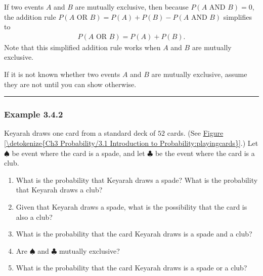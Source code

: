 \documentclass[letterpaper,10pt,english]{jupyterBook}
\begin{document}
\sphinxAtStartPar
If two events \(A\) and \(B\) are mutually exclusive, then because \(P(A \text{ AND } B) = 0\), the addition rule \(P(A \text{ OR } B) = P(A) + P(B) - P(A \text{ AND } B)\) simplifies to
\begin{equation*}
\begin{split} P(A\text{ OR } B) = P(A) + P(B). \end{split}
\end{equation*}
\sphinxAtStartPar
Note that this simplified addition rule works  when \(A\) and \(B\) are mutually exclusive.

\sphinxAtStartPar
If it is not known whether two events \(A\) and \(B\) are mutually exclusive, assume they are not until you can show otherwise.


\bigskip\hrule\bigskip



\subsubsection{Example 3.4.2}
\label{\detokenize{Ch3 Probability/3.4 Addition Rules and Mutually Exclusive Events:example-3-4-2}}
\sphinxAtStartPar
Keyarah draws one card from a standard deck of \(52\) cards. (See \hyperref[\detokenize{Ch3 Probability/3.1 Introduction to Probability:playingcards}]{Figure \ref{\detokenize{Ch3 Probability/3.1 Introduction to Probability:playingcards}}}.) Let \(♠\) be event where the card is a spade, and let \(♣\) be the event where the card is a club.
\begin{enumerate}
%
\item {} 
\sphinxAtStartPar
What is the probability that Keyarah draws a spade? What is the probability that Keyarah draws a club?

\item {} 
\sphinxAtStartPar
Given that Keyarah draws a spade, what is the possibility that the card is also a club?

\item {} 
\sphinxAtStartPar
What is the probability that the card Keyarah draws is a spade and a club?

\item {} 
\sphinxAtStartPar
Are \(♠\) and \(♣\) mutually exclusive?

\item {} 
\sphinxAtStartPar
What is the probability that the card Keyarah draws is a spade or a club?

\end{enumerate}
\end{document}
